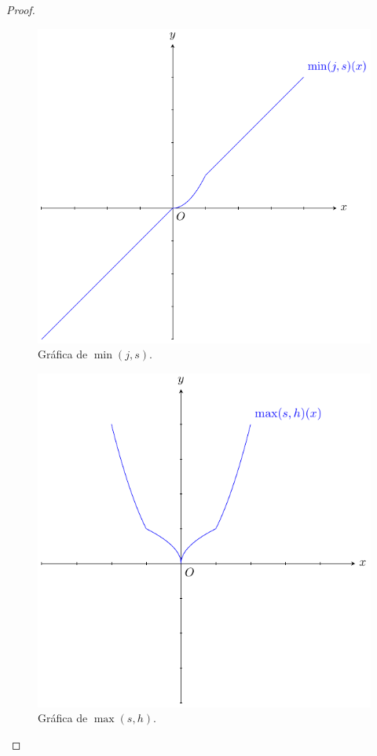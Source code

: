 \documentclass[12pt]{article}
\begin{document}
\begin{enumerate}
\begin{proof}
        \begin{figure}
            \begin{center}
                \includegraphics[scale=1]{images/3_12_2.pdf}
            \end{center}
            \caption{Gráfica de $\min(j,s)$.}
        \end{figure}

        \begin{figure}
            \begin{center}
                \includegraphics[scale=1]{images/3_12_3.pdf}
            \end{center}
            \caption{Gráfica de $\max(s,h)$.}
        \end{figure}


\end{proof}
\end{enumerate}
\end{document}
